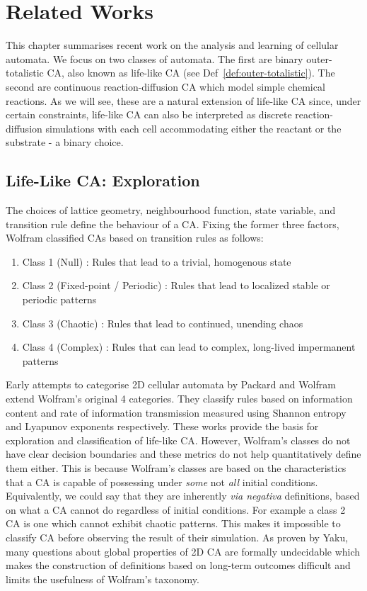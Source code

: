 \chapter{Related Works}

This chapter summarises recent work on the analysis and learning of cellular automata. We focus on two classes of automata. The first are binary outer-totalistic CA, also known as life-like CA (see Def~\ref{def:outer-totalistic}). The second are continuous reaction-diffusion CA which model simple chemical reactions. As we will see, these are a natural extension of life-like CA since, under certain constraints, life-like CA can also be interpreted as discrete reaction-diffusion simulations with each cell accommodating either the reactant or the substrate - a binary choice.

\section{Life-Like CA: Exploration}

The choices of lattice geometry, neighbourhood function, state variable, and transition rule define the behaviour of a CA. Fixing the former three factors, Wolfram\cite{wolfram1986theory} classified CAs based on transition rules as follows:
\begin{enumerate}
  \item Class 1 (Null) : Rules that lead to a trivial, homogenous state
  \item Class 2 (Fixed-point / Periodic) : Rules that lead to localized stable or periodic patterns
  \item Class 3 (Chaotic) : Rules that lead to continued, unending chaos
  \item Class 4 (Complex) : Rules that can lead to complex, long-lived impermanent patterns
\end{enumerate}

Early attempts to categorise 2D cellular automata by Packard and Wolfram\cite{packard1985two} extend Wolfram's original 4 categories. They classify rules based on information content and rate of information transmission measured using Shannon entropy and Lyapunov exponents respectively. These works provide the basis for exploration and classification of life-like CA. However, Wolfram's classes do not have clear decision boundaries and these metrics do not help quantitatively define them either. This is because Wolfram's classes are based on the characteristics that a CA is capable of possessing under \textit{some} not \textit{all} initial conditions. Equivalently, we could say that they are inherently \textit{via negativa} definitions, based on what a CA cannot do regardless of initial conditions.  For example a class 2 CA is one which cannot exhibit chaotic patterns. This makes it impossible to classify CA before observing the result of their simulation. As proven by Yaku\cite{yaku1973constructibility}, many questions about global properties of 2D CA are formally undecidable which makes the construction of definitions based on long-term outcomes difficult and limits the usefulness of Wolfram's taxonomy.

